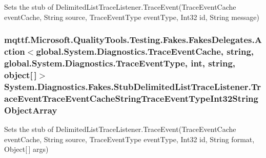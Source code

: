 Sets the stub of Delimited\-List\-Trace\-Listener.\-Trace\-Event(\-Trace\-Event\-Cache event\-Cache, String source, Trace\-Event\-Type event\-Type, Int32 id, String message)

\hypertarget{class_system_1_1_diagnostics_1_1_fakes_1_1_stub_delimited_list_trace_listener_a06ac5a82c4505c2dc00116fbaad2445e}{
\subsubsection[{Trace\-Event\-Trace\-Event\-Cache\-String\-Trace\-Event\-Type\-Int32\-String\-Object\-Array}]{\setlength{\rightskip}{0pt plus 5cm}mqttf.\-Microsoft.\-Quality\-Tools.\-Testing.\-Fakes.\-Fakes\-Delegates.\-Action$<$global.\-System.\-Diagnostics.\-Trace\-Event\-Cache, string, global.\-System.\-Diagnostics.\-Trace\-Event\-Type, int, string, object\mbox{[}$\,$\mbox{]}$>$ System.\-Diagnostics.\-Fakes.\-Stub\-Delimited\-List\-Trace\-Listener.\-Trace\-Event\-Trace\-Event\-Cache\-String\-Trace\-Event\-Type\-Int32\-String\-Object\-Array}}\label{class_system_1_1_diagnostics_1_1_fakes_1_1_stub_delimited_list_trace_listener_a06ac5a82c4505c2dc00116fbaad2445e}


Sets the stub of Delimited\-List\-Trace\-Listener.\-Trace\-Event(\-Trace\-Event\-Cache event\-Cache, String source, Trace\-Event\-Type event\-Type, Int32 id, String format, Object\mbox{[}$\,$\mbox{]} args)

